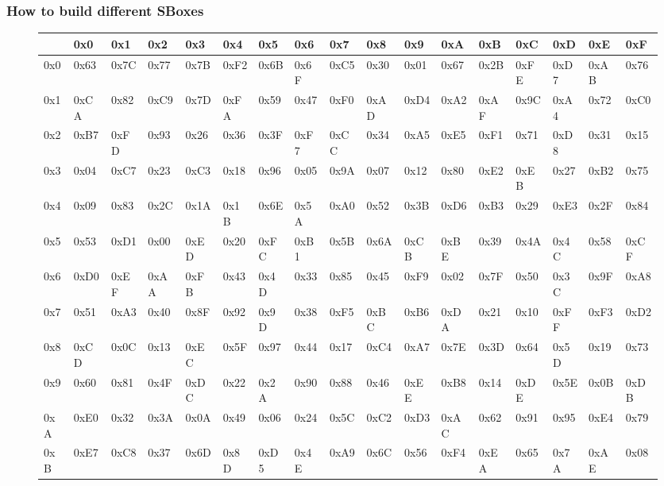 \documentclass[a4paper,twoside]{llncs}
\begin{document}
\subsubsection{How to build different SBoxes}
\begin{figure}[h]{\tiny
\begin{center}
\begin{tabular}[]{|l||l|l|l|l|l|l|l|l|l|l|l|l|l|l|l|l|}\hline
    & 0x0  & 0x1  & 0x2  & 0x3  & 0x4  & 0x5  & 0x6  & 0x7  & 0x8  & 0x9  & 0xA  & 0xB  & 0xC  & 0xD  & 0xE  & 0xF \\\hline\hline
0x0 & 0x63 & 0x7C & 0x77 & 0x7B & 0xF2 & 0x6B & 0x6F & 0xC5 & 0x30 & 0x01 & 0x67 & 0x2B & 0xFE & 0xD7 & 0xAB & 0x76\\\hline
0x1 & 0xCA & 0x82 & 0xC9 & 0x7D & 0xFA & 0x59 & 0x47 & 0xF0 & 0xAD & 0xD4 & 0xA2 & 0xAF & 0x9C & 0xA4 & 0x72 & 0xC0 \\\hline
0x2 & 0xB7 & 0xFD & 0x93 & 0x26 & 0x36 & 0x3F & 0xF7 & 0xCC & 0x34 & 0xA5 & 0xE5 & 0xF1 & 0x71 & 0xD8 & 0x31 & 0x15 \\\hline
0x3 & 0x04 & 0xC7 & 0x23 & 0xC3 & 0x18 & 0x96 & 0x05 & 0x9A & 0x07 & 0x12 & 0x80 & 0xE2 & 0xEB & 0x27 & 0xB2 & 0x75 \\\hline
0x4 & 0x09 & 0x83 & 0x2C & 0x1A & 0x1B & 0x6E & 0x5A & 0xA0 & 0x52 & 0x3B & 0xD6 & 0xB3 & 0x29 & 0xE3 & 0x2F & 0x84 \\\hline
0x5 & 0x53 & 0xD1 & 0x00 & 0xED & 0x20 & 0xFC & 0xB1 & 0x5B & 0x6A & 0xCB & 0xBE & 0x39 & 0x4A & 0x4C & 0x58 & 0xCF \\\hline
0x6 & 0xD0 & 0xEF & 0xAA & 0xFB & 0x43 & 0x4D & 0x33 & 0x85 & 0x45 & 0xF9 & 0x02 & 0x7F & 0x50 & 0x3C & 0x9F & 0xA8 \\\hline
0x7 & 0x51 & 0xA3 & 0x40 & 0x8F & 0x92 & 0x9D & 0x38 & 0xF5 & 0xBC & 0xB6 & 0xDA & 0x21 & 0x10 & 0xFF & 0xF3 & 0xD2 \\\hline
0x8 & 0xCD & 0x0C & 0x13 & 0xEC & 0x5F & 0x97 & 0x44 & 0x17 & 0xC4 & 0xA7 & 0x7E & 0x3D & 0x64 & 0x5D & 0x19 & 0x73 \\\hline
0x9 & 0x60 & 0x81 & 0x4F & 0xDC & 0x22 & 0x2A & 0x90 & 0x88 & 0x46 & 0xEE & 0xB8 & 0x14 & 0xDE & 0x5E & 0x0B & 0xDB \\\hline
0xA & 0xE0 & 0x32 & 0x3A & 0x0A & 0x49 & 0x06 & 0x24 & 0x5C & 0xC2 & 0xD3 & 0xAC & 0x62 & 0x91 & 0x95 & 0xE4 & 0x79 \\\hline
0xB & 0xE7 & 0xC8 & 0x37 & 0x6D & 0x8D & 0xD5 & 0x4E & 0xA9 & 0x6C & 0x56 & 0xF4 & 0xEA & 0x65 & 0x7A & 0xAE & 0x08 \\\hline

\end{tabular}
\end{center}}
\end{figure}
\end{document}
